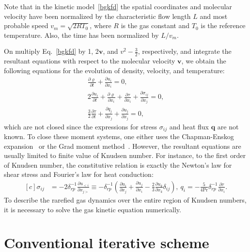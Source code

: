 \documentclass[onefignum,onetabnum]{siamart171218}
\begin{document}
Note that in the kinetic model~\eqref{bgkfd} the spatial coordinates and molecular velocity have been normalized by the characteristic flow length $L$ and most probable speed $v_m=\sqrt{2RT_0}$, where $R$ is the gas constant and $T_0$ is the reference temperature. Also, the time has been normalized by $L/v_m$. 


On multiply Eq.~\eqref{bgkfd} by 1, 2$\bm{v}$, and $v^2-\frac{3}{2}$, respectively, and integrate the resultant equations with respect to the molecular velocity $\bm{v}$, we obtain the following equations for the evolution of density, velocity, and temperature: 
\begin{equation}\label{eq123}
\begin{aligned}
\frac{\partial {\varrho}}{\partial{t}}+\frac{\partial {u_i}}{\partial{x_i}}=0, \\
2\frac{\partial {u_i}}{\partial{t}}+\frac{\partial {\varrho}}{\partial{x_i}}+\frac{\partial {\tau}}{\partial{x_i}}+\frac{\partial {{\sigma_{ij}}}}{\partial{x_j}}=0, \\
\frac{3}{2}\frac{\partial {\tau}}{\partial{t}}+\frac{\partial {{q_j}}}{\partial{x_j}}+\frac{\partial {u_j}}{\partial{x_j}}=0,
\end{aligned}
\end{equation}
which are not closed since the expressions for stress $\sigma_{ij}$ and heat flux $\bm{q}$ are not known. To close these moment systems, one either uses the Chapman-Enskog expansion~\cite{CE} or the Grad moment method~\cite{Grad1949}. However, the resultant equations are usually limited to finite value of Knudsen number. For instance, to the first order of Knudsen number, the constitutive relation is exactly the Newton's law for shear stress and Fourier's law for heat conduction:
\begin{equation}\label{NSF_relations_2}
\begin{aligned}[c]
\sigma_{ij}& =-2\delta_{rp}^{-1}\frac{\partial u_{<i}}{\partial {x_{j>}}}\equiv
-\delta_{rp}^{-1}\left(\frac{\partial u_{i}}{\partial x_{j}}+\frac{\partial u_{j}}{\partial x_{i}}-\frac{2}{3}\frac{\partial u_{k}}{\partial x_{k}}\delta_{ij}\right), \
q_i =-\frac{5}{4\text{Pr}}\delta_{rp}^{-1}\frac{\partial \tau}{\partial x_i}.
\end{aligned}
\end{equation} 
To describe the rarefied gas dynamics over the entire region of Knudsen numbers, it is necessary to solve the gas kinetic equation numerically.


\section{Conventional iterative scheme}\label{section_CIS}
\end{document}
